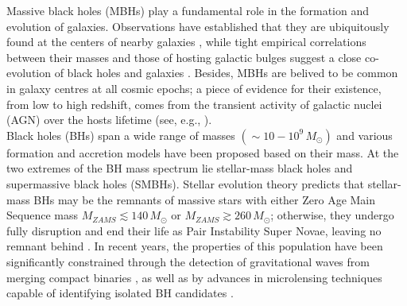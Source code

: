 \documentclass[12pt,twoside,openany]{book}
\begin{document}
Massive black holes (MBHs) play a fundamental role in the formation and evolution of galaxies. Observations have established that they are ubiquitously found at the centers of nearby galaxies \parencite{Kormendy_1995}, while tight empirical correlations between their masses and those of hosting galactic bulges suggest a close co-evolution of black holes and galaxies \parencite{Magorrian_1998}. Besides, MBHs are belived to be common in galaxy centres at all cosmic epochs; a piece of evidence for their existence, from low to high redshift, comes from the transient activity of galactic nuclei (AGN) over the hosts lifetime (see, e.g., \citealt{Jahnke_2025}).\\Black holes (BHs) span a wide range of masses $(\sim 10-10^{9}\,M_\odot)$ and various formation and accretion models have been proposed based on their mass. At the two extremes of the BH mass spectrum lie stellar-mass black holes and supermassive black holes (SMBHs). Stellar evolution theory predicts that stellar-mass BHs may be the remnants of massive stars with either Zero Age Main Sequence mass $M_{ZAMS}\lesssim 140\,M_\odot$ or $M_{ZAMS}\gtrsim 260\,M_\odot$; otherwise, they undergo fully disruption and end their life as Pair Instability Super Novae, leaving no remnant behind \parencite{Farmer_2019}. In recent years, the properties of this population have been significantly constrained through the detection of gravitational waves from merging compact binaries \parencite{Abbott_2016}, as well as by advances in microlensing techniques capable of identifying isolated BH candidates \parencite{Bennett_2002}.
\end{document}
